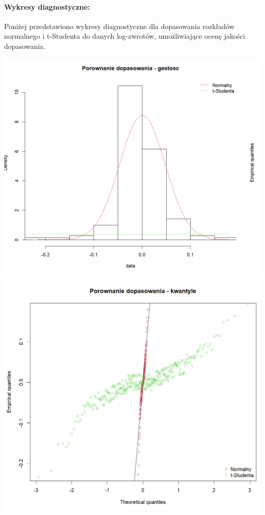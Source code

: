 \documentclass[a4paper,11pt]{article}
\begin{document}
\paragraph{Wykresy diagnostyczne:}

Poniżej przedstawiono wykresy diagnostyczne dla dopasowania rozkładów normalnego i t-Studenta do danych log-zwrotów, umożliwiające ocenę jakości dopasowania.

\centerline{\includegraphics[width=14cm]{./Janek/dopasowanie gestosc.png}}
\centerline{\includegraphics[width=14cm]{./Janek/dopasowanie kwantyle.png}} 
\end{document}
